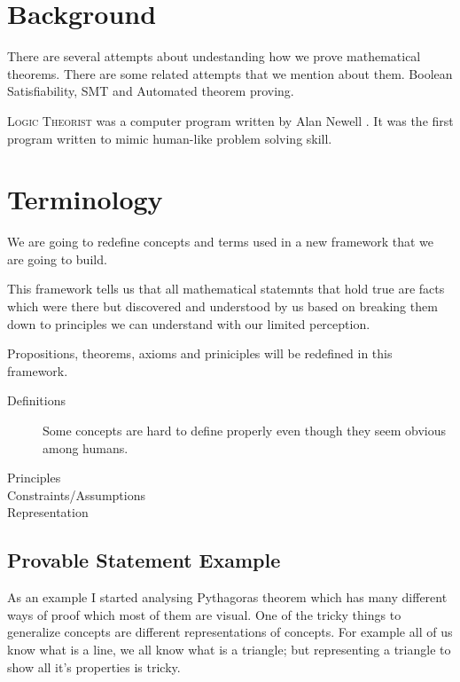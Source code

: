 \documentclass{article}
\begin{document}
\section{Background}

There are several attempts about undestanding how we prove mathematical theorems. There are some related attempts that we mention about them. Boolean Satisfiability, SMT and Automated theorem proving.

\textsc{Logic Theorist} was a computer program written by Alan Newell . It was the first program written to mimic human-like problem solving skill. 



\section{Terminology}

We are going to redefine concepts and terms used in a new framework that we are going to build.

This framework tells us that all mathematical statemnts that hold true are facts which were there but discovered and understood by us based on breaking them down to principles we can understand with our limited perception.

Propositions, theorems, axioms and priniciples will be redefined in this framework.

\begin{description}
\item[Definitions]
Some concepts are hard to define properly even though they seem obvious among humans. 
\item[Principles]
 
\item[Constraints/Assumptions]

\item[Representation]


\end{description} 
 


\subsection*{Provable Statement Example}

As an example I started analysing Pythagoras theorem which has many different ways of proof which most of them are visual. One of the tricky things to generalize concepts are different representations of concepts. For example all of us know what is a line, we all know what is a triangle; but representing a triangle to show all it's properties is tricky.
\end{document}
